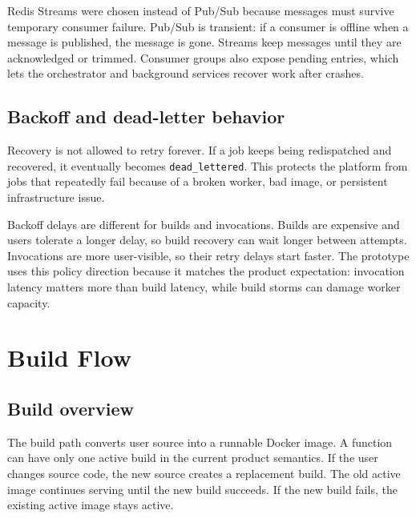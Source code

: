 \documentclass[12pt,a4paper]{report}
\newcommand{\state}[1]{\texttt{#1}}
\begin{document}
Redis Streams were chosen instead of Pub/Sub because messages must survive
temporary consumer failure. Pub/Sub is transient: if a consumer is offline when
a message is published, the message is gone. Streams keep messages until they
are acknowledged or trimmed. Consumer groups also expose pending entries, which
lets the orchestrator and background services recover work after crashes.

\section{Backoff and dead-letter behavior}

Recovery is not allowed to retry forever. If a job keeps being redispatched and
recovered, it eventually becomes \state{dead\_lettered}. This protects the
platform from jobs that repeatedly fail because of a broken worker, bad image,
or persistent infrastructure issue.

Backoff delays are different for builds and invocations. Builds are expensive
and users tolerate a longer delay, so build recovery can wait longer between
attempts. Invocations are more user-visible, so their retry delays start faster.
The prototype uses this policy direction because it matches the product
expectation: invocation latency matters more than build latency, while build
storms can damage worker capacity.

\clearpage

\chapter{Build Flow}

\section{Build overview}

The build path converts user source into a runnable Docker image. A function
can have only one active build in the current product semantics. If the user
changes source code, the new source creates a replacement build. The old active
image continues serving until the new build succeeds. If the new build fails,
the existing active image stays active.
\end{document}
